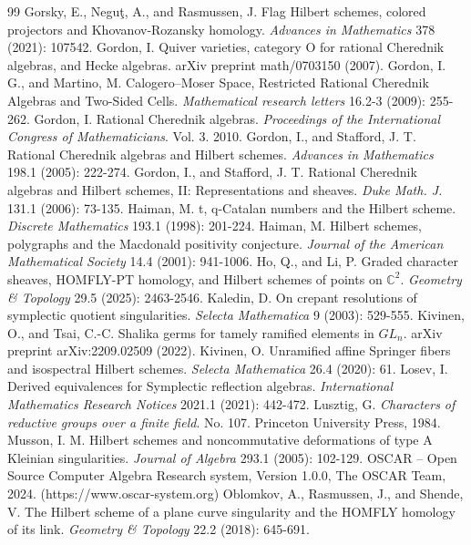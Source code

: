 \documentclass{amsart}
\numberwithin{equation}{section}
\theoremstyle{definition}
\newcommand{\C}{{\mathbb C}}
\begin{document}
\begin{thebibliography}{99}
     Gorsky, E., Neguţ, A., and Rasmussen, J. Flag Hilbert schemes, colored projectors and Khovanov-Rozansky homology. \textit{Advances in Mathematics} 378 (2021): 107542.
     Gordon, I. Quiver varieties, category O for rational Cherednik algebras, and Hecke algebras. arXiv preprint math/0703150 (2007).
     Gordon, I. G., and Martino, M. Calogero--Moser Space, Restricted Rational Cherednik Algebras and Two-Sided Cells. \textit{Mathematical research letters} 16.2-3 (2009): 255-262.
     Gordon, I. Rational Cherednik algebras. \textit{Proceedings of the International Congress of Mathematicians}. Vol. 3. 2010.
     Gordon, I., and Stafford, J. T. Rational Cherednik algebras and Hilbert schemes. \textit{Advances in Mathematics} 198.1 (2005): 222-274.
     Gordon, I., and Stafford, J. T. Rational Cherednik algebras and Hilbert schemes, II: Representations and sheaves. \textit{Duke Math. J.} 131.1 (2006): 73-135.
     Haiman, M. t, q-Catalan numbers and the Hilbert scheme. \textit{Discrete Mathematics} 193.1 (1998): 201-224.
     Haiman, M. Hilbert schemes, polygraphs and the Macdonald positivity conjecture. \textit{Journal of the American Mathematical Society} 14.4 (2001): 941-1006.
     Ho, Q., and Li, P. Graded character sheaves, HOMFLY-PT homology, and Hilbert schemes of points on $\C^2$. \textit{Geometry \& Topology} 29.5 (2025): 2463-2546.
     Kaledin, D. On crepant resolutions of symplectic quotient singularities. \textit{Selecta Mathematica} 9 (2003): 529-555.
     Kivinen, O., and Tsai, C.-C. Shalika germs for tamely ramified elements in $ GL_n$. arXiv preprint arXiv:2209.02509 (2022).
     Kivinen, O. Unramified affine Springer fibers and isospectral Hilbert schemes. \textit{Selecta Mathematica} 26.4 (2020): 61.
     Losev, I. Derived equivalences for Symplectic reflection algebras. \textit{International Mathematics Research Notices} 2021.1 (2021): 442-472.
     Lusztig, G. \textit{Characters of reductive groups over a finite field}. No. 107. Princeton University Press, 1984.
     Musson, I. M. Hilbert schemes and noncommutative deformations of type A Kleinian singularities. \textit{Journal of Algebra} 293.1 (2005): 102-129.
     OSCAR -- Open Source Computer Algebra Research system, Version 1.0.0, The OSCAR Team, 2024. (https://www.oscar-system.org)
     Oblomkov, A., Rasmussen, J., and Shende, V. The Hilbert scheme of a plane curve singularity and the HOMFLY homology of its link. \textit{Geometry \& Topology} 22.2 (2018): 645-691.

\end{thebibliography}
\end{document}
